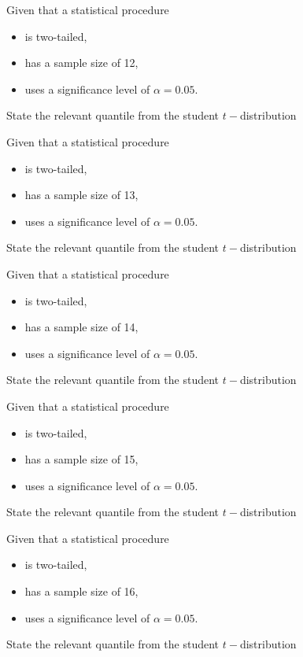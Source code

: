\documentclass[12pt, a4paper]{report}
\theoremstyle{definition}
\theoremstyle{remark}
\begin{document}
	
	Given that a statistical procedure 
	\begin{itemize}
		\item is two-tailed,
		\item has a sample size of 12,
		\item uses a significance level of $\alpha = 0.05$.
	\end{itemize} \smallskip
	State the relevant quantile from the student $t-$distribution
	



	
	
	
	Given that a statistical procedure 
	\begin{itemize}
		\item is two-tailed,
		\item has a sample size of 13,
		\item uses a significance level of $\alpha = 0.05$.
	\end{itemize} \smallskip
	State the relevant quantile from the student $t-$distribution
	


	
	
	
	Given that a statistical procedure 
	\begin{itemize}
		\item is two-tailed,
		\item has a sample size of 14,
		\item uses a significance level of $\alpha = 0.05$.
	\end{itemize} \smallskip
	State the relevant quantile from the student $t-$distribution
	


	
	
	
	Given that a statistical procedure
	\begin{itemize}
		\item is two-tailed,
		\item has a sample size of 15,
		\item uses a significance level of $\alpha = 0.05$.
	\end{itemize} \smallskip
	State the relevant quantile from the student $t-$distribution
	


	
	
	
	Given that a statistical procedure 
	\begin{itemize}
		\item is two-tailed,
		\item has a sample size of 16,
		\item uses a significance level of $\alpha = 0.05$.
	\end{itemize} \smallskip
	State the relevant quantile from the student $t-$distribution
	
\end{document}
